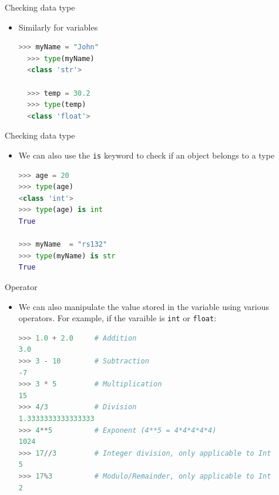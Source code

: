 \documentclass[10pt,xcolor={table,dvipsnames},t]{beamer}
\begin{document}
\begin{frame}[fragile]{Checking data type}
  \begin{itemize}
    \item Similarly for variables
\begin{lstlisting}[language=python]
  >>> myName = "John"
  >>> type(myName)
  <class 'str'>

  >>> temp = 30.2
  >>> type(temp)
  <class 'float'>
\end{lstlisting}
  \end{itemize}
\end{frame}

\begin{frame}[fragile]{Checking data type}
  \begin{itemize}
    \item We can also use the \texttt{is} keyword to check if an object belongs to a type 
\begin{lstlisting}[language=python]
>>> age = 20
>>> type(age)
<class 'int'>
>>> type(age) is int
True

>>> myName  = "rs132"
>>> type(myName) is str
True
\end{lstlisting}
  \end{itemize}
\end{frame}

\begin{frame}[fragile]{Operator}
  \begin{itemize}
    \item We can also manipulate the value stored in the variable using various operators. For example, if the varaible is \texttt{int} or \texttt{float}:
\begin{lstlisting}[language=python]
>>> 1.0 + 2.0     # Addition
3.0
>>> 3 - 10        # Subtraction
-7
>>> 3 * 5         # Multiplication
15
>>> 4/3           # Division
1.3333333333333333
>>> 4**5          # Exponent (4**5 = 4*4*4*4*4)
1024
>>> 17//3         # Integer division, only applicable to Int
5
>>> 17%3          # Modulo/Remainder, only applicable to Int
2
\end{lstlisting}
  \end{itemize}
\end{frame}
\end{document}
